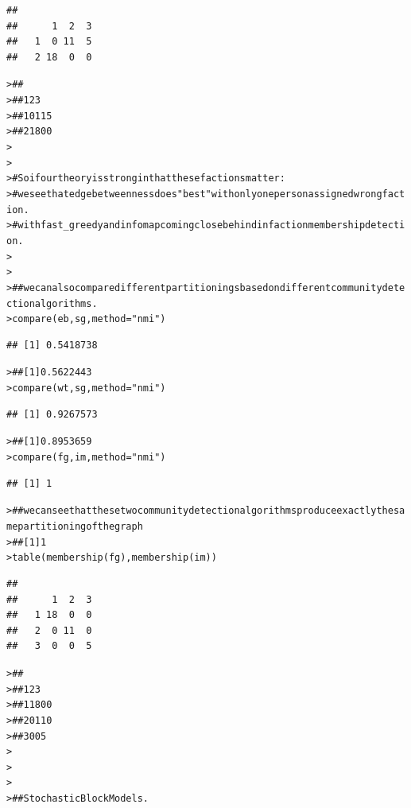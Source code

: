 \documentclass[12pt]{article}\usepackage[]{graphicx}\usepackage[]{color}
\makeatletter
\newcommand{\hlstr}[1]{\textcolor[rgb]{0.82,0.78,0.62}{#1}}%
\newcommand{\hlcom}[1]{\textcolor[rgb]{0.404,0.408,0.42}{#1}}%
\newcommand{\hlstd}[1]{\textcolor[rgb]{0.882,0.878,0.898}{#1}}%
\newcommand{\hlkwc}[1]{\textcolor[rgb]{0.812,0.522,0.388}{#1}}%
\newcommand{\hlkwd}[1]{\textcolor[rgb]{0.733,0.388,0.812}{#1}}%
\newenvironment{kframe}{%
 \def\at@end@of@kframe{}%
 \ifinner\ifhmode%
  \def\at@end@of@kframe{\end{minipage}}%
  \begin{minipage}{\columnwidth}%
 \fi\fi%
 \def\FrameCommand##1{\hskip\@totalleftmargin \hskip-\fboxsep
 \colorbox{shadecolor}{##1}\hskip-\fboxsep
     \hskip-\linewidth \hskip-\@totalleftmargin \hskip\columnwidth}%
 \MakeFramed {\advance\hsize-\width
   \@totalleftmargin\z@ \linewidth\hsize
   \@setminipage}}%
 {\par\unskip\endMakeFramed%
 \at@end@of@kframe}
\newenvironment{knitrout}{}{} %
\makeatother
\begin{document}
\begin{flushleft}
\begin{center}
\begin{knitrout}
\begin{kframe}
\begin{verbatim}
##    
##      1  2  3
##   1  0 11  5
##   2 18  0  0
\end{verbatim}
\begin{alltt}
\hlstd{> }\hlcom{##}
\hlstd{> }\hlcom{##      1  2  3}
\hlstd{> }\hlcom{##   1  0 11  5}
\hlstd{> }\hlcom{##   2 18  0  0}
\hlstd{> }
\hlstd{> }
\hlstd{> }\hlcom{#  So if our theory is strong in that these factions matter:}
\hlstd{> }\hlcom{#     we see that edge betweenness does "best" with only one person assigned wrong faction.}
\hlstd{> }\hlcom{#     with fast_greedy and infomap coming close behind in faction membership detection.}
\hlstd{> }
\hlstd{> }
\hlstd{> }\hlcom{## we can also compare different partitionings based on different community detection algorithms.}
\hlstd{> }\hlkwd{compare}\hlstd{(eb, sg,} \hlkwc{method} \hlstd{=} \hlstr{"nmi"}\hlstd{)}
\end{alltt}
\begin{verbatim}
## [1] 0.5418738
\end{verbatim}
\begin{alltt}
\hlstd{> }\hlcom{## [1] 0.5622443}
\hlstd{> }\hlkwd{compare}\hlstd{(wt, sg,} \hlkwc{method} \hlstd{=} \hlstr{"nmi"}\hlstd{)}
\end{alltt}
\begin{verbatim}
## [1] 0.9267573
\end{verbatim}
\begin{alltt}
\hlstd{> }\hlcom{## [1] 0.8953659}
\hlstd{> }\hlkwd{compare}\hlstd{(fg, im,} \hlkwc{method} \hlstd{=} \hlstr{"nmi"}\hlstd{)}
\end{alltt}
\begin{verbatim}
## [1] 1
\end{verbatim}
\begin{alltt}
\hlstd{> }\hlcom{## we can see that these two community detection algorithms produce exactly the same partitioning of the graph}
\hlstd{> }\hlcom{## [1] 1}
\hlstd{> }\hlkwd{table}\hlstd{(}\hlkwd{membership}\hlstd{(fg),}\hlkwd{membership}\hlstd{(im))}
\end{alltt}
\begin{verbatim}
##    
##      1  2  3
##   1 18  0  0
##   2  0 11  0
##   3  0  0  5
\end{verbatim}
\begin{alltt}
\hlstd{> }\hlcom{##}
\hlstd{> }\hlcom{##      1  2  3}
\hlstd{> }\hlcom{##   1 18  0  0}
\hlstd{> }\hlcom{##   2  0 11  0}
\hlstd{> }\hlcom{##   3  0  0  5}
\hlstd{> }
\hlstd{> }
\hlstd{> }
\hlstd{> }\hlcom{## Stochastic Block Models.}

\end{alltt}
\end{kframe}
\end{knitrout}
\end{center}
\end{flushleft}
\end{document}
